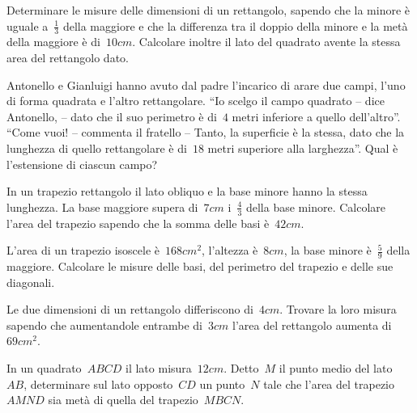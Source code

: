 \begin{multicols}{2}
\begin{esercizio}[\Ast]
\label{ese:16.126}
Determinare le misure delle dimensioni di un rettangolo, sapendo che la minore è uguale a~$\frac{1}{3}$ della maggiore e che la differenza tra il doppio della minore e la metà della maggiore è di~$10\unit{cm}$. Calcolare inoltre il lato del quadrato avente la stessa area del rettangolo dato.
\end{esercizio}

\begin{esercizio}[\Ast]
\label{ese:16.127}
Antonello e Gianluigi hanno avuto dal padre l'incarico di arare due campi, l'uno di forma quadrata e l'altro rettangolare. ``Io scelgo il campo quadrato -- dice Antonello, -- dato che il suo perimetro è di~$4$ metri inferiore a quello dell'altro''. ``Come vuoi! -- commenta il fratello -- Tanto, la superficie è la stessa, dato che la lunghezza di quello rettangolare è di~$18$ metri superiore alla larghezza''. Qual è l'estensione di ciascun campo?
\end{esercizio}

\begin{esercizio}[\Ast]
\label{ese:16.128}
In un trapezio rettangolo il lato obliquo e la base minore hanno la stessa lunghezza. La base maggiore supera di~$7\unit{cm}$ i~$\frac{4}{3}$ della base minore. Calcolare l'area del trapezio sapendo che la somma delle basi è~$42\unit{cm}$.
\end{esercizio}

\begin{esercizio}[\Ast]
\label{ese:16.129}
L'area di un trapezio isoscele è~$168\unit{cm^2}$, l'altezza è~$8\unit{cm}$, la base minore è~$\frac{5}{9}$ della maggiore. Calcolare le misure delle basi, del perimetro del trapezio e delle sue diagonali.
\end{esercizio}

\begin{esercizio}[\Ast]
\label{ese:16.130}
Le due dimensioni di un rettangolo differiscono di~$4\unit{cm}$. Trovare la loro misura sapendo che aumentandole entrambe di~$3\unit{cm}$ l'area del rettangolo aumenta di~$69\unit{cm^2}$.
\end{esercizio}

\begin{esercizio}[\Ast]
\label{ese:16.131}
In un quadrato~$ABCD$ il lato misura~$12\unit{cm}$. Detto~$M$ il punto medio del lato~$AB$, determinare sul lato opposto~$CD$ un punto~$N$ tale che l'area del trapezio~$AMND$ sia metà di quella del trapezio~$MBCN$.
\end{esercizio}


\end{multicols}
